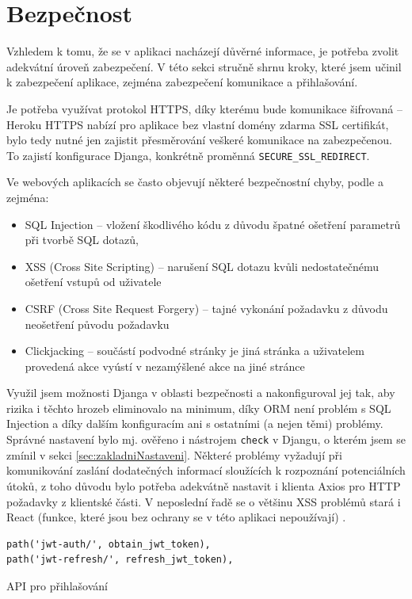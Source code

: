     \section{Bezpečnost}\label{sec:bezpecnost}
    Vzhledem k tomu, že se v aplikaci nacházejí důvěrné informace, je potřeba zvolit adekvátní úroveň zabezpečení. V této sekci stručně shrnu kroky, které jsem učinil k zabezpečení aplikace, zejména zabezpečení komunikace a přihlašování.
    
    Je potřeba využívat protokol HTTPS, díky kterému bude komunikace šifrovaná -- Heroku HTTPS nabízí pro aplikace bez vlastní domény zdarma SSL certifikát, bylo tedy nutné jen zajistit přesměrování veškeré komunikace na zabezpečenou. To zajistí konfigurace Djanga, konkrétně proměnná \verb|SECURE_SSL_REDIRECT|.
    
    Ve webových aplikacích se často objevují některé bezpečnostní chyby, podle \cite{bezpecnost1} a \cite{bezpecnost2} zejména:
    \begin{itemize}
        \item SQL Injection -- vložení škodlivého kódu z důvodu špatné ošetření parametrů při tvorbě SQL dotazů,
        \item XSS (Cross Site Scripting) -- narušení SQL dotazu kvůli nedostatečnému ošetření vstupů od uživatele
        \item CSRF (Cross Site Request Forgery) -- tajné vykonání požadavku z důvodu neošetření původu požadavku
        \item Clickjacking -- součástí podvodné stránky je jiná stránka a uživatelem provedená akce vyústí v nezamýšlené akce na jiné stránce
    \end{itemize}
    Využil jsem možnosti Djanga v oblasti bezpečnosti \cite{bezpecnost1} a nakonfiguroval jej tak, aby rizika i těchto hrozeb eliminovalo na minimum, díky ORM není problém s SQL Injection a díky dalším konfiguracím ani s ostatními (a nejen těmi) problémy. Správné nastavení bylo mj. ověřeno i nástrojem \verb|check| v Djangu, o kterém jsem se zmínil v sekci \ref{sec:zakladniNastaveni}. Některé problémy vyžadují při komunikování zaslání dodatečných informací sloužících k rozpoznání potenciálních útoků, z toho důvodu bylo potřeba adekvátně nastavit i klienta Axios pro HTTP požadavky z klientské části. V neposlední řadě se o většinu XSS problémů stará i React (funkce, které jsou bez ochrany se v této aplikaci nepoužívají) \cite{bezpecnost3}.
    
    \begin{listing}[ht]
    	\begin{verbatim}
path('jwt-auth/', obtain_jwt_token),
path('jwt-refresh/', refresh_jwt_token),
    	\end{verbatim}
    	\caption{API pro přihlašování}\label{lst:jwt}
    \end{listing}
    

